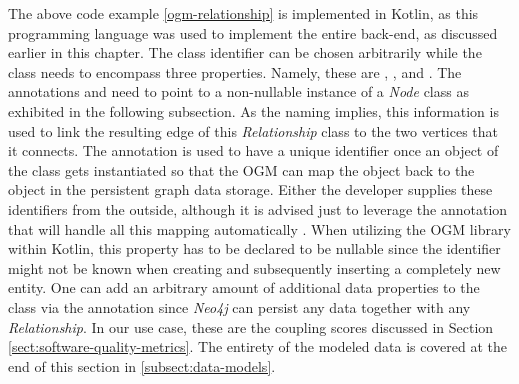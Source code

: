 \documentclass[12pt,a4paper]{report}
\begin{document}
The above code example \ref{ogm-relationship} is implemented in Kotlin, as this
programming language was used to implement the entire back-end, as discussed
earlier in this chapter. The class identifier can be chosen arbitrarily while
the class needs to encompass three properties. Namely, these are ,
, and . The annotations 
and  need to point to a non-nullable instance of a \textit{Node}
class as exhibited in the following subsection. As the naming implies, this
information is used to link the resulting edge of this \textit{Relationship}
class to the two vertices that it connects. The  annotation
is used to have a unique identifier once an object of the class gets
instantiated so that the OGM can map the object back to the object in the
persistent graph data storage. Either the developer supplies these identifiers
from the outside, although it is advised just to leverage the 
annotation that will handle all this mapping automatically
\cite{neo4j-ogm}. When utilizing the OGM library within Kotlin, this property
has to be declared to be nullable since the identifier might not be known when
creating and subsequently inserting a completely new entity. One can
add an arbitrary amount of additional data properties to the class via the
 annotation since \textit{Neo4j} can persist any data together
with any \textit{Relationship}. In our use case, these are the coupling scores
discussed in Section \ref{sect:software-quality-metrics}. The entirety of the
modeled data is covered at the end of this section in \ref{subsect:data-models}.
\end{document}
